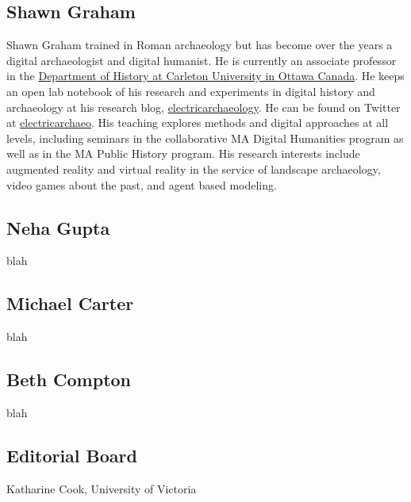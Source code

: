 \documentclass[english,]{book}
\begin{document}
\subsection*{Shawn Graham}\label{shawn-graham}

Shawn Graham trained in Roman archaeology but has become over the years
a digital archaeologist and digital humanist. He is currently an
associate professor in the \href{http://carleton.ca}{Department of
History at Carleton University in Ottawa Canada}. He keeps an open lab
notebook of his research and experiments in digital history and
archaeology at his research blog,
\href{http://electricarchaeology.ca}{electricarchaeology}. He can be
found on Twitter at
\href{http://twitter.com/electricarchaeo}{electricarchaeo}. His teaching
explores methods and digital approaches at all levels, including
seminars in the collaborative MA Digital Humanities program as well as
in the MA Public History program. His research interests include
augmented reality and virtual reality in the service of landscape
archaeology, video games about the past, and agent based modeling.

\subsection*{Neha Gupta}\label{neha-gupta}

blah

\subsection*{Michael Carter}\label{michael-carter}

blah

\subsection*{Beth Compton}\label{beth-compton}

blah

\subsection*{Editorial Board}\label{editorial-board}

Katharine Cook, University of Victoria
\end{document}
